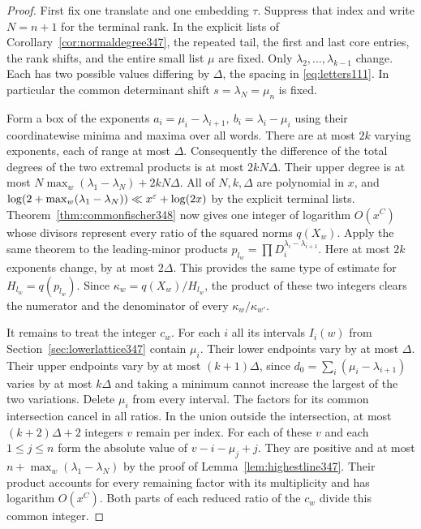 \documentclass[a4paper,11pt]{article}
\theoremstyle{definition}
\theoremstyle{remark}
\numberwithin{equation}{section}
\begin{document}
\begin{proof}
First fix one translate and one embedding \(\tau\). Suppress
that index and write \(N=n+1\) for the terminal rank.
In the explicit lists of Corollary~\ref{cor:normaldegree347},
the repeated tail, the first and last core entries, the rank
shifts, and the entire small list \(\mu\) are fixed.
Only \(\lambda_2,\ldots,\lambda_{k-1}\) change. Each has two
possible values differing by \(\Delta\), the spacing in
\eqref{eq:letters111}. In particular the common determinant
shift \(s=\lambda_N=\mu_n\) is fixed.

Form a box of the exponents
\(a_i=\mu_i-\lambda_{i+1},\ b_i=\lambda_i-\mu_i\) using their
coordinatewise minima and maxima over all words. There are at
most \(2k\) varying exponents, each of range at most \(\Delta\).
Consequently the difference of the total degrees of the two
extremal products is at most \(2kN\Delta\). Their upper degree
is at most \(N\max_w(\lambda_1-\lambda_N)+2kN\Delta\).
All of \(N,k,\Delta\) are polynomial in \(x\), and
\(\log(2+\max_w(\lambda_1-\lambda_N))\ll x^\varepsilon+\log(2x)\)
by the explicit terminal lists. Theorem~\ref{thm:commonfischer348}
now gives one integer of logarithm \(O(x^C)\) whose divisors
represent every ratio of the squared norms \(q(X_w)\).
Apply the same theorem to the leading-minor products
\(p_{l_w}=\prod D_i^{\lambda_i-\lambda_{i+1}}\).
Here at most \(2k\) exponents change, by at most \(2\Delta\).
This provides the same type of estimate for
\(H_{l_w}=q(p_{l_w})\). Since \(\kappa_w=q(X_w)/H_{l_w}\),
the product of these two integers clears the numerator and the
denominator of every \(\kappa_w/\kappa_{w'}\).

It remains to treat the integer \(c_w\). For each \(i\) all its
intervals \(I_i(w)\) from Section~\ref{sec:lowerlattice347}
contain \(\mu_i\). Their lower endpoints vary by at most
\(\Delta\). Their upper endpoints vary by at most
\((k+1)\Delta\), since \(d_0=\sum_i(\mu_i-\lambda_{i+1})\)
varies by at most \(k\Delta\) and taking a minimum cannot
increase the largest of the two variations. Delete \(\mu_i\)
from every interval. The factors for its common intersection
cancel in all ratios. In the union outside the intersection,
at most \((k+2)\Delta+2\) integers \(v\) remain per index.
For each of these \(v\) and each \(1\le j\le n\) form the
absolute value of \(v-i-\mu_j+j\). They are positive and at
most \(n+\max_w(\lambda_1-\lambda_N)\) by the proof of
Lemma~\ref{lem:highestline347}. Their product accounts for
every remaining factor with its multiplicity and has logarithm
\(O(x^C)\). Both parts of each reduced ratio of the \(c_w\)
divide this common integer.


\end{proof}
\end{document}

